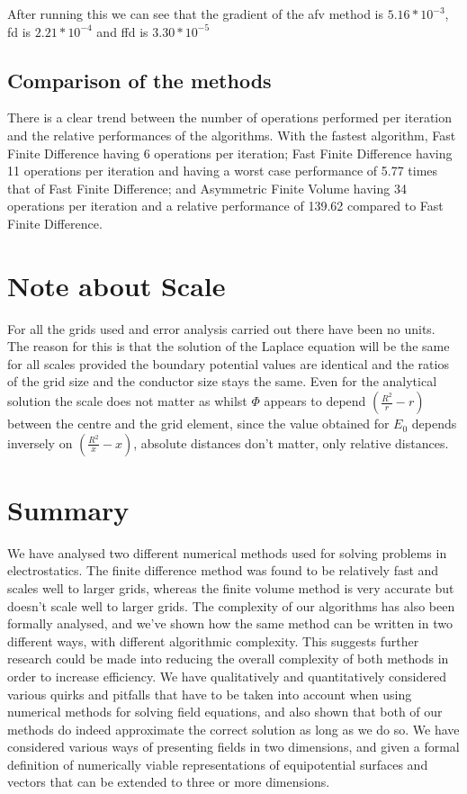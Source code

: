 \documentclass[aps,twocolumn,pre,nofootinbib,10pt]{revtex4-1}
\begin{document}
After running this we can see that the gradient of the afv method is $5.16*10^{-3}$, fd is $2.21*10^{-4}$ and ffd is $3.30*10^{-5}$

\subsection{Comparison of the methods}

There is a clear trend between the number of operations performed per iteration and the relative performances of the algorithms. With the fastest algorithm, Fast Finite Difference having 6 operations per iteration; Fast Finite Difference having 11 operations per iteration and having a worst case performance of 5.77 times that of Fast Finite Difference; and Asymmetric Finite Volume having 34 operations per iteration and a relative performance of 139.62 compared to Fast
Finite Difference.

\section{Note about Scale}
For all the grids used and error analysis carried out there have been no units. The reason for this is that the solution of the Laplace equation will be the same for all scales provided the boundary potential values are identical and the ratios of the grid size and the conductor size stays the same. Even for the analytical solution the scale does not matter as whilst \(\Phi\) appears to depend \((\frac{R^2}{r}-r)\) between the centre and the grid element, since the value obtained for \(E_0\) depends inversely on \((\frac{R^2}{x}-x)\), absolute distances don't matter, only relative distances. 



\section{Summary \label{sec:sum}}
We have analysed two different numerical methods used for solving problems in electrostatics. The finite difference method was found to be relatively fast and scales well to larger grids, whereas the finite volume method is very accurate but doesn't scale well to larger grids. The complexity of our algorithms has also been formally analysed, and we've shown how the same method can be written in two different ways, with different algorithmic complexity. This suggests further research could be made into reducing the overall complexity of both methods in order to increase efficiency. We have qualitatively and quantitatively considered various quirks and pitfalls that have to be taken into account when using numerical methods for solving field equations, and also shown that both of our methods do indeed approximate the correct solution as long as we do so. We have considered various ways of presenting fields in two dimensions, and given a formal definition of numerically viable representations of equipotential 
surfaces and vectors that can be extended to three or more dimensions.
\end{document}
